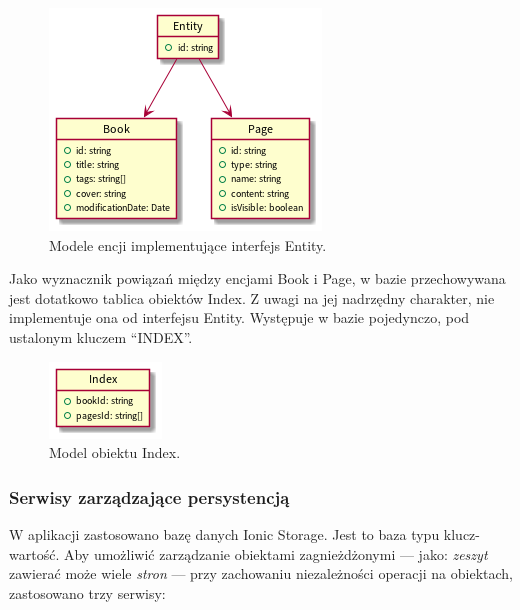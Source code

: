 \begin{figure}[H]
	\begin{center}
		\includegraphics[scale=0.9]{media/Entity.png}
	\end{center}
	\caption{Modele encji implementujące interfejs Entity.}
	\label{rys:entity}
\end{figure}

Jako wyznacznik powiązań między encjami Book i Page, w bazie przechowywana jest dotatkowo tablica obiektów Index.
Z uwagi na jej nadrzędny charakter, nie implementuje ona od interfejsu Entity. Występuje w bazie pojedynczo, pod ustalonym
kluczem \enquote{INDEX}.

\begin{figure}[H]
	\begin{center}
		\includegraphics[scale=0.9]{media/Index.png}
	\end{center}
	\caption{Model obiektu Index.}
	\label{rys:index}
\end{figure}

\subsubsection{Serwisy zarządzające persystencją}
W aplikacji zastosowano bazę danych Ionic Storage. Jest to baza typu klucz-wartość. Aby umożliwić
zarządzanie obiektami zagnieżdżonymi — jako: \textit{zeszyt} zawierać może wiele \textit{stron} — przy zachowaniu
niezależności operacji na obiektach, zastosowano trzy serwisy:

